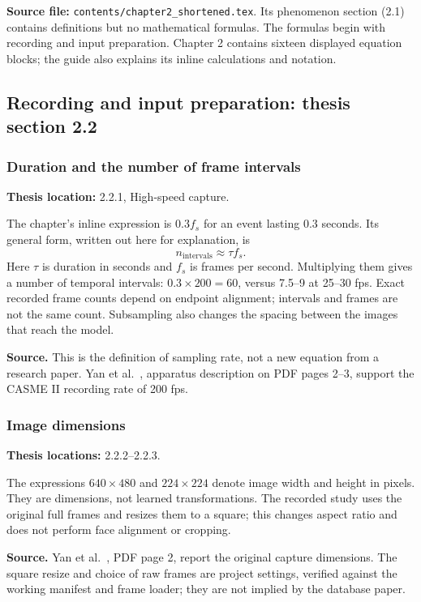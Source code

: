 \documentclass[11pt,a4paper]{article}
\numberwithin{equation}{section}
\begin{document}
\textbf{Source file:} \texttt{contents/chapter2\_shortened.tex}. Its phenomenon
section (2.1) contains definitions but no mathematical formulas. The formulas
begin with recording and input preparation. Chapter 2 contains sixteen displayed
equation blocks; the guide also explains its inline calculations and notation.

\subsection{Recording and input preparation: thesis section 2.2}

\subsubsection{Duration and the number of frame intervals}
\label{fg:capture}
\textbf{Thesis location:} 2.2.1, High-speed capture.

The chapter's inline expression is $0.3f_s$ for an event lasting $0.3$ seconds.
Its general form, written out here for explanation, is
\begin{equation}
    n_{\mathrm{intervals}}\approx \tau f_s.
    \label{fg:eq:capture}
\end{equation}
Here $\tau$ is duration in seconds and $f_s$ is frames per second. Multiplying
them gives a number of temporal intervals: $0.3\times200=60$, versus 7.5--9 at
25--30 fps. Exact recorded frame counts depend on endpoint alignment; intervals
and frames are not the same count. Subsampling also changes the spacing between
the images that reach the model.

\textbf{Source.} This is the definition of sampling rate, not a new equation
from a research paper. Yan et al.~\cite{yan2014}, apparatus description on PDF
pages 2--3, support the CASME II recording rate of 200 fps.

\subsubsection{Image dimensions}
\label{fg:geometry}
\textbf{Thesis locations:} 2.2.2--2.2.3.

The expressions $640\times480$ and $224\times224$ denote image width and height
in pixels. They are dimensions, not learned transformations. The recorded study
uses the original full frames and resizes them to a square; this changes aspect
ratio and does not perform face alignment or cropping.

\textbf{Source.} Yan et al.~\cite{yan2014}, PDF page 2, report the original
capture dimensions. The square resize and choice of raw frames are project
settings, verified against the working manifest and frame loader; they are not
implied by the database paper.
\end{document}
